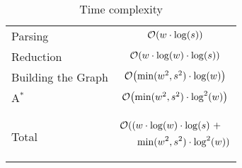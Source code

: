 \documentclass[sigconf,nonacm,screen]{acmart}
\begin{document}
\begin{table}[h]
    \centering
    \begin{tabular}{lc}
        \toprule
        Parsing            & $\mathcal{O}\hspace{-0.15em}\left(w\cdot\log(s)\right)$                    \vphantom{${X^X_X}^X_X$}\vspace{1mm} \\
        Reduction          & $\mathcal{O}\hspace{-0.15em}\left(w\cdot\log(w)\cdot\log(s)\right)$        \vphantom{${X^X_X}^X_X$}\vspace{1mm} \\
        Building the Graph & $\mathcal{O}\hspace{-0.15em}\left(\min(w^2,s^2)\cdot\log(w)\right)$        \vphantom{${X^X_X}^X_X$}\vspace{1mm} \\
        A$\mathbf{^*}$     & $\mathcal{O}\hspace{-0.15em}\left(\min(w^2,s^2)\cdot{\log}^2(w)\right)$  \vphantom{${X^X_X}^X_X$}\vspace{1mm} \\
        \midrule
        \vspace{-5mm}\\
        Total
            &   \multicolumn{1}{c}{
                    \begin{minipage}{4cm}
                        \setlength{\jot}{0pt} %
                        \begin{align*}
                                \bigO\left((\right. &\hspace{-0.5mm} w\cdot\log(w)\cdot\logs ~+  \\
                                                    &\hspace{-0.5mm} \min(w^2,s^2)\cdot\log^2(w)) \vphantom{\underset{X}{X}}
                        \end{align*}
                    \end{minipage}
                }
            \\
        \bottomrule
    \end{tabular}
    \caption{Time complexity}
    \label{table:time_complexity}
    \vspace{-5mm}
\end{table}
\end{document}

